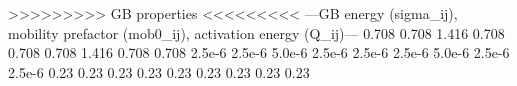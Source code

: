 >>>>>>>>> GB properties <<<<<<<<<
---GB energy (sigma_ij), mobility prefactor (mob0_ij), activation energy (Q_ij)---
0.708 0.708 1.416
0.708 0.708 0.708
1.416 0.708 0.708
2.5e-6 2.5e-6 5.0e-6
2.5e-6 2.5e-6 2.5e-6
5.0e-6 2.5e-6 2.5e-6
0.23	0.23	0.23
0.23	0.23	0.23
0.23	0.23	0.23
